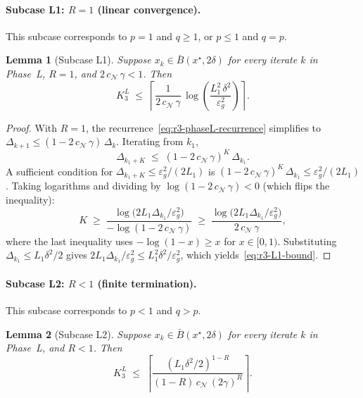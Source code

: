\documentclass[11pt,a4paper]{article}
\theoremstyle{plain}
\newtheorem{lemma}{Lemma}
\theoremstyle{definition}
\newcommand{\eps}{\varepsilon}
\newcommand{\epsg}{\eps_{g}}
\newcommand{\xstar}{x^{\star}}
\newcommand{\Lone}{L_{1}}
\newcommand{\setN}{\mathcal{N}}
\newcommand{\cN}{c_{\setN}}
\begin{document}
\paragraph{Subcase L1: $R = 1$ (linear convergence).}

This subcase corresponds to $p = 1$ and $q \geq 1$, or $p \leq 1$ and $q = p$.

\begin{lemma}[Subcase L1]\label{lem:r3-L1}
Suppose $x_{k} \in \bar B(\xstar, 2\delta)$ for every iterate $k$ in Phase~L, $R = 1$, and $2\,\cN\,\gamma < 1$. Then
\begin{equation}\label{eq:r3-L1-bound}
K_{3}^{L} \;\leq\; \left\lceil \frac{1}{2\,\cN\,\gamma}\,\log\!\left(\frac{\Lone^{2}\,\delta^{2}}{\epsg^{2}}\right) \right\rceil.
\end{equation}
\end{lemma}

\begin{proof}
With $R = 1$, the recurrence~\eqref{eq:r3-phaseL-recurrence} simplifies to $\Delta_{k+1} \leq (1 - 2\,\cN\,\gamma)\,\Delta_{k}$. Iterating from $k_{1}$,
\[
\Delta_{k_{1}+K} \;\leq\; (1 - 2\,\cN\,\gamma)^{K}\,\Delta_{k_{1}}.
\]
A sufficient condition for $\Delta_{k_{1}+K} \leq \epsg^{2}/(2\Lone)$ is $(1 - 2\,\cN\,\gamma)^{K}\,\Delta_{k_{1}} \leq \epsg^{2}/(2\Lone)$. Taking logarithms and dividing by $\log(1 - 2\,\cN\,\gamma) < 0$ (which flips the inequality):
\[
K \;\geq\; \frac{\log\bigl(2\Lone\Delta_{k_{1}}/\epsg^{2}\bigr)}{-\log(1 - 2\,\cN\,\gamma)} \;\geq\; \frac{\log\bigl(2\Lone\Delta_{k_{1}}/\epsg^{2}\bigr)}{2\,\cN\,\gamma},
\]
where the last inequality uses $-\log(1-x) \geq x$ for $x \in [0,1)$. Substituting $\Delta_{k_{1}} \leq \Lone\delta^{2}/2$ gives $2\Lone\Delta_{k_{1}}/\epsg^{2} \leq \Lone^{2}\delta^{2}/\epsg^{2}$, which yields~\eqref{eq:r3-L1-bound}.
\end{proof}

\paragraph{Subcase L2: $R < 1$ (finite termination).}

This subcase corresponds to $p < 1$ and $q > p$.

\begin{lemma}[Subcase L2]\label{lem:r3-L2}
Suppose $x_{k} \in \bar B(\xstar, 2\delta)$ for every iterate $k$ in Phase~L, and $R < 1$. Then
\begin{equation}\label{eq:r3-L2-bound}
K_{3}^{L} \;\leq\; \left\lceil \frac{(\Lone\delta^{2}/2)^{1-R}}{(1-R)\,\cN\,(2\gamma)^{R}} \right\rceil.
\end{equation}
\end{lemma}
\end{document}
